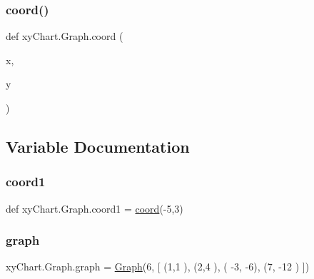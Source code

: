 \subsubsection{\texorpdfstring{coord()}{coord()}}
{\footnotesize\ttfamily def xy\+Chart.\+Graph.\+coord (\begin{DoxyParamCaption}\item[{}]{x,  }\item[{}]{y }\end{DoxyParamCaption})}



\subsection{Variable Documentation}
\hypertarget{namespacexy_chart_1_1_graph_a9918deaf97fee10618afa250ca5d73eb}{}\label{namespacexy_chart_1_1_graph_a9918deaf97fee10618afa250ca5d73eb} 
\subsubsection{\texorpdfstring{coord1}{coord1}}
{\footnotesize\ttfamily def xy\+Chart.\+Graph.\+coord1 = \hyperlink{namespacexy_chart_1_1_graph_a3e2c4e3989f17aadcd35098ef933eab5}{coord}(-\/5,3)}

\hypertarget{namespacexy_chart_1_1_graph_a98b3e64a8154411b646bfd625526d45c}{}\label{namespacexy_chart_1_1_graph_a98b3e64a8154411b646bfd625526d45c} 
\subsubsection{\texorpdfstring{graph}{graph}}
{\footnotesize\ttfamily xy\+Chart.\+Graph.\+graph = \hyperlink{classxy_chart_1_1_graph_1_1_graph}{Graph}(6, \mbox{[} (1,1 ), (2,4 ), ( -\/3, -\/6), (7, -\/12 ) \mbox{]})}

